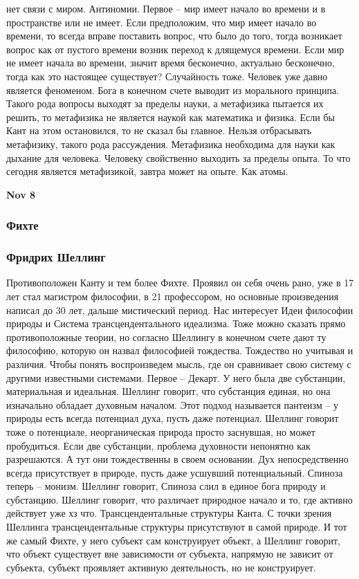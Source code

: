 \documentclass[a4paper, 12pt]{article}
\begin{document}
нет связи с миром. Антиномии. Первое -- мир имеет начало во времени 
и в пространстве или не имеет. Если предположим, что мир имеет начало во 
времени, то всегда вправе поставить вопрос, что было до того, тогда 
возникает вопрос как от пустого времени возник переход к длящемуся 
времени. Если мир не имеет начала во времени, значит время бесконечно, 
актуально бесконечно, тогда как это настоящее существует? Случайность 
тоже. Человек уже давно является феноменом. Бога в конечном счете 
выводит из морального принципа. Такого рода вопросы выходят за пределы 
науки, а метафизика пытается их решить, то метафизика не является наукой 
как математика и физика. Если бы Кант на этом остановился, то не сказал 
бы главное. Нельзя отбрасывать метафизику, такого рода рассуждения. 
Метафизика необходима для науки как дыхание для человека. Человеку 
свойственно выходить за пределы опыта. То что сегодня является 
метафизикой, завтра может на опыте. Как атомы.

\hfill\textbf{Nov 8}


\subsubsection{Фихте}


\subsubsection{Фридрих Шеллинг}

Противоположен Канту и тем более Фихте. Проявил он себя очень рано, уже 
в 17 лет стал магистром философии, в 21 профессором, но основные 
произведения написал до 30 лет, дальше мистический период. Нас 
интересует Идеи философии природы и Система трансцендентального 
идеализма. Тоже можно сказать прямо противоположные теории, но согласно 
Шеллингу в конечном счете дают ту философию, которую он назвал 
философией тождества. Тождество но учитывая и различия. Чтобы понять 
воспроизведем мысль, где он сравнивает свою систему с другими известными 
системами. Первое -- Декарт. У него была две субстанции, материальная 
и идеальная. Шеллинг говорит, что субстанция единая, но она изначально 
обладает духовным началом. Этот подход называется пантеизм -- у природы 
есть всегда потенциал духа, пусть даже потенциал. Шеллинг говорит тоже 
о потенциале, неорганическая природа просто заснувшая, но может 
пробудиться. Если две субстанции, проблема духовности непонятно как 
разрешаются. А тут они тождественны в своем основании. Дух 
непосредственно всегда присутствует в природе, пусть даже усшувший 
потенциальный. Спиноза теперь -- монизм. Шеллинг говорит, Спиноза слил 
в единое бога природу и субстанцию. Шеллинг говорит, что различает 
природное начало и то, где активно действует уже хз что. 
Трансцендентальные структуры Канта. С точки зрения Шеллинга 
трансцендентальные структуры присутствуют в самой природе. И тот же 
самый Фихте, у него субъект сам конструирует объект, а Шеллинг говорит, 
что объект существует вне зависимости от субъекта, напрямую не зависит 
от субъекта, субъект проявляет активную деятельность, но не 
конструирует.
\end{document}
